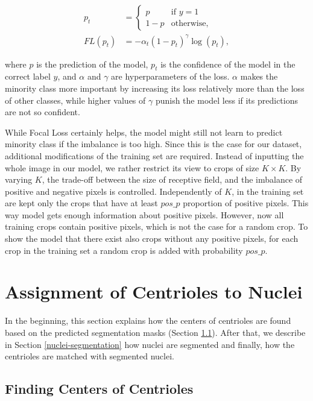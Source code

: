 \documentclass[9pt,conference,compsocconf, article]{IEEEtran}
\begin{document}
\begin{align}
    p_t &= 
    \begin{cases}
     p & \text{if } y = 1  \\
     1 - p & \text{otherwise},
    \end{cases} \\
    FL(p_t) &= -\alpha_t (1 - p_t)^{\gamma}\log(p_t),
\end{align}

\noindent
where $p$ is the prediction of the model, $p_t$ is the confidence of the model in the correct label $y$, and $\alpha$ and $\gamma$  are hyperparameters of the loss. $\alpha$ makes the minority class more important by increasing its loss relatively more than the loss of other classes, while higher values of $\gamma$ punish the model less if its predictions are not so confident.

While Focal Loss certainly helps, the model might still not learn to predict minority class if the imbalance is too high. Since this is the case for our dataset, additional modifications of the training set are required. Instead of inputting the whole image in our model, we rather restrict its view to crops of size $K \times K$. By varying $K$, the trade-off between the size of receptive field, and the imbalance of positive and negative pixels is controlled. Independently of $K$, in the training set are kept only the crops that have at least $pos\_p$ proportion of positive pixels. This way model gets enough information about positive pixels. However, now all training crops contain positive pixels, which is not the case for a random crop. To show the model that there exist also crops without any positive pixels, for each crop in the training set a random crop is added with probability $pos\_p$.




\section{Assignment of Centrioles to Nuclei}
In the beginning, this section explains how the centers of centrioles are found based on the predicted segmentation masks (Section \ref{findings-centers-of-centrioles}). After that, we describe in Section \ref{nuclei-segmentation} how nuclei are segmented and finally, how the centrioles are matched with segmented nuclei. 


\subsection{Finding Centers of Centrioles}
\label{findings-centers-of-centrioles}
\end{document}
